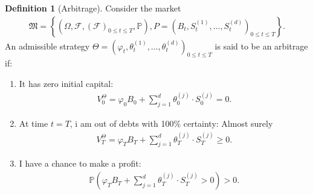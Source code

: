 \documentclass{article}
\theoremstyle{definition}
\newtheorem{definition}[theorem]{Definition}
\numberwithin{equation}{section}
\begin{document}
\begin{definition}[Arbitrage]
    Consider the market
    \begin{align}
        \mathfrak{M} =
        \left\{
            \left(
                \Omega, 
                \mathscr{F}, 
                \left(
                    \mathscr{F}
                \right)_{0 \leq t \leq T},
                \mathbb{P}
            \right),
            P =
            \left(
                B_t,
                S_t^{(1)},
                \ldots,
                S_t^{(d)}
            \right)_{0 \leq t \leq T}
        \right\}.
    \end{align}
    An admissible strategy $\Theta = \left(\varphi_t, \theta_t^{(1)}, \ldots, \theta_t^{(d)}\right)_{0 \leq t \leq T}$ is said to be an arbitrage if:
    \begin{enumerate}
        \item It has zero initial capital:
        \begin{align}
            V_0^\Theta = \varphi_0B_0 + \sum_{j = 1}^d\theta_0^{(j)} \cdot S_0^{(j)} = 0.
        \end{align}
        \item At time $t = T$, i am out of debts with 100\% certainty: Almost surely
        \begin{align}
            V_T^\Theta = \varphi_T B_T + \sum_{j = 1}^d\theta_T^{(j)} \cdot S_T^{(j)} \geq 0.
        \end{align}
        \item I have a chance to make a profit:
        \begin{align}
            \mathbb{P}
            \left(
                \varphi_TB_T + \sum_{j = 1}^d \theta_T^{(j)} \cdot S_T^{(j)} > 0
            \right) > 0.
        \end{align}
    \end{enumerate}
\end{definition}
\end{document}
